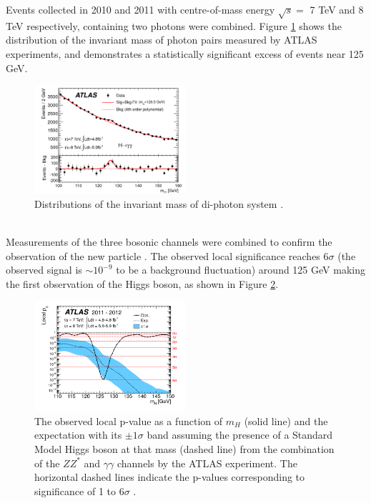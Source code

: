 Events collected in 2010 and 2011 with centre-of-mass energy $\sqrt{s}=$ 7 TeV and 8 TeV respectively, containing two photons were combined. Figure \ref{fig:chap1:H2012:Hyy} shows the distribution of the invariant mass of photon pairs measured by ATLAS experiments, and demonstrates a statistically significant excess of events near 125 GeV. 
\begin{figure}[htbp]
    \centering
    \includegraphics[width=0.5\textwidth]{Ch1/Img/Hmyy.png}
    \caption{Distributions of the invariant mass of di-photon system \cite{ATLAS_2012}.}
    \label{fig:chap1:H2012:Hyy}
\end{figure}
\\
Measurements of the three bosonic channels were combined to confirm the observation of the new particle \cite{ATLAS_2012}. The observed local significance reaches $6\sigma$ (the observed signal is $\sim10^{-9}$ to be a background fluctuation) around 125 GeV making the first observation of the Higgs boson, as shown in Figure \ref{fig:chap1:H2012:P0}.
\begin{figure}[htbp]
    \centering
    \includegraphics[width=0.5\textwidth]{Ch1/Img/Hp0.png}
    \caption{The observed local p-value as a function of $m_H$ (solid line) and the expectation with its $\pm1\sigma$ band assuming the presence of a Standard Model Higgs boson at that mass (dashed line) from the combination of the $ZZ^*$ and  $\gamma\gamma$ channels by the ATLAS experiment. The horizontal dashed lines indicate the p-values corresponding to significance of 1 to 6$\sigma$ \cite{ATLAS_2012}.}
    \label{fig:chap1:H2012:P0}
\end{figure}
